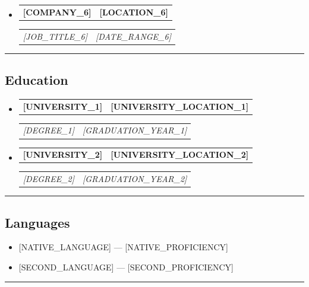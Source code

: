 \documentclass[10pt,letterpaper]{article}
\makeatletter
\newcommand{\headerrow}[2]{\begin{tabular*}{\linewidth}{l@{\extracolsep{\fill}}r} #1 & #2 \\ \end{tabular*}}
\makeatother
\begin{document}
\begin{itemize}[leftmargin=1em, noitemsep]
    \item
      \headerrow
      {\textbf{[COMPANY_6]}}
      {\textbf{[LOCATION_6]}}
      \headerrow
      {\emph{[JOB_TITLE_6]}}
      {\emph{[DATE_RANGE_6]}}

\end{itemize}



\hrule
\vspace{-1em}
\subsection*{\Large Education}

\begin{itemize}[leftmargin=1em, noitemsep]
    \item
          \headerrow
          {\textbf{[UNIVERSITY_1]}}
          {\textbf{[UNIVERSITY_LOCATION_1]}}
          \headerrow
          {\emph{[DEGREE_1]}}
          {\emph{[GRADUATION_YEAR_1]}}

    \item
          \headerrow
          {\textbf{[UNIVERSITY_2]}}
          {\textbf{[UNIVERSITY_LOCATION_2]}}
          \headerrow
          {\emph{[DEGREE_2]}}
          {\emph{[GRADUATION_YEAR_2]}}

\end{itemize}

\hrule
\vspace{-1em}
\subsection*{\Large Languages}

\begin{itemize}[leftmargin=1em,noitemsep]
    \item {[NATIVE_LANGUAGE]} — [NATIVE_PROFICIENCY]
    \item {[SECOND_LANGUAGE]} — [SECOND_PROFICIENCY]
\end{itemize}

\hrule
\end{document}
